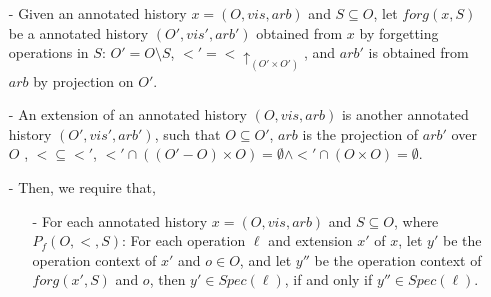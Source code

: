 \begin{itemize}
\item[-] Given an annotated history $x = (O,\mathit{vis},\mathit{arb})$ and $S \subseteq O$, let $forg(x,S)$ be a annotated history $(O',\mathit{vis}',\mathit{arb}')$ obtained from $x$ by forgetting operations in $S$: $O' = O \setminus S$, $<' = < \uparrow_{(O' \times O')}$, and $\mathit{arb}'$ is obtained from $\mathit{arb}$ by projection on $O'$.


\item[-] An extension of an annotated history $(O,\mathit{vis},\mathit{arb})$ is another annotated history $(O',\mathit{vis}',\mathit{arb}')$, such that $O \subseteq O'$, $\mathit{arb}$ is the projection of $\mathit{arb}'$ over $O$ , $< \subseteq <'$, $<' \cap ( (O'-O) \times O ) = \emptyset \wedge <' \cap ( O \times O ) = \emptyset$. 




\item[-] Then, we require that, 
    \begin{itemize}
    \setlength{\itemsep}{0.5pt}
    \item[-] For each annotated history $x = (O,\mathit{vis},\mathit{arb})$ and $S \subseteq O$, where $P_f(O,<,S)$: For each operation $\ell$ and extension $x'$ of $x$, let $y'$ be the operation context of $x'$ and $o \in O$, and let $y''$ be the operation context of $forg(x',S)$ and $o$, then $y' \in Spec(\ell)$, if and only if $y'' \in Spec(\ell)$. 
    

\end{itemize}
\end{itemize}
